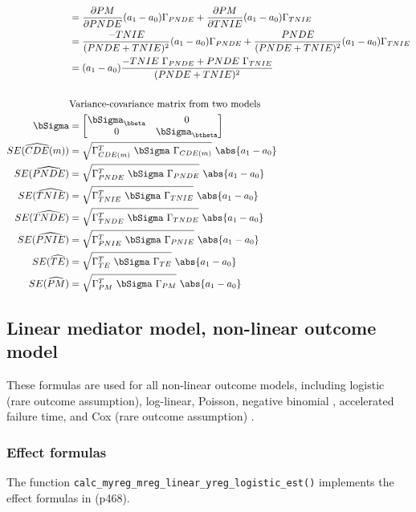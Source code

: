 \documentclass[dvipdfmx,10pt]{article}
\begin{document}
\begin{align*}
  &= \frac{\partial PM}{\partial PNDE}(a_{1}-a_{0})\Gamma_{PNDE} + \frac{\partial PM}{\partial TNIE}(a_{1}-a_{0})\Gamma_{TNIE}\\
  &= \frac{-TNIE}{(PNDE+TNIE)^{2}}(a_{1}-a_{0})\Gamma_{PNDE} + \frac{PNDE}{(PNDE+TNIE)^{2}}(a_{1}-a_{0})\Gamma_{TNIE}\\
  &= (a_{1}-a_{0}) \frac{-TNIE~\Gamma_{PNDE} + PNDE~\Gamma_{TNIE}}{(PNDE+TNIE)^{2}}\\
  \\
  &\text{Variance-covariance matrix from two models}\\
  \bSigma &=
           \begin{bmatrix}
             \bSigma_{\bbeta} & 0 \\
             0 & \bSigma_{\btheta} \\
           \end{bmatrix}\\
  SE(\widehat{CDE}(m)) &= \sqrt{\Gamma_{CDE(m)}^{T} ~\bSigma~ \Gamma_{CDE(m)}} ~ \abs{a_{1} - a_{0}}\\
  SE(\widehat{PNDE}) &= \sqrt{\Gamma_{PNDE}^{T} ~\bSigma~ \Gamma_{PNDE}} ~ \abs{a_{1} - a_{0}}\\
  SE(\widehat{TNIE}) &= \sqrt{\Gamma_{TNIE}^{T} ~\bSigma~ \Gamma_{TNIE}} ~ \abs{a_{1} - a_{0}}\\
  SE(\widehat{TNDE}) &= \sqrt{\Gamma_{TNDE}^{T} ~\bSigma~ \Gamma_{TNDE}} ~ \abs{a_{1} - a_{0}}\\
  SE(\widehat{PNIE}) &= \sqrt{\Gamma_{PNIE}^{T} ~\bSigma~ \Gamma_{PNIE}} ~ \abs{a_{1} - a_{0}}\\
  SE(\widehat{TE}) &= \sqrt{\Gamma_{TE}^{T} ~\bSigma~ \Gamma_{TE}} ~ \abs{a_{1} - a_{0}}\\
  SE(\widehat{PM}) &= \sqrt{\Gamma_{PM}^{T} ~\bSigma~ \Gamma_{PM}} ~ \abs{a_{1} - a_{0}}\\
\end{align*}


\subsection{Linear mediator model, non-linear outcome model}
\label{sec:org1623223}
These formulas are used for all non-linear outcome models, including logistic (rare outcome assumption), log-linear, Poisson, negative binomial \cite{valeriMediationAnalysisAllowing2013}, accelerated failure time, and Cox (rare outcome assumption) \cite{valeriSASMacroCausal2015}.

\subsubsection{Effect formulas}
\label{sec:org02f96e2}
The function \texttt{calc\_myreg\_mreg\_linear\_yreg\_logistic\_est()} implements the effect formulas in \cite{vanderweeleExplanationCausalInference2015} (p468).
\end{document}
